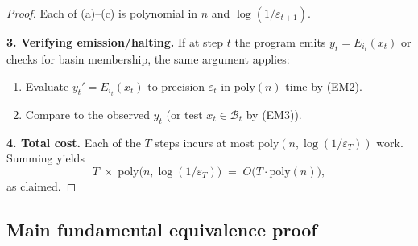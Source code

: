 \documentclass[12pt]{article}
\theoremstyle{definition}
\theoremstyle{plain}
\begin{document}
\begin{proof}
Each of (a)--(c) is polynomial in \(n\) and \(\log(1/\varepsilon_{t+1})\).

\medskip
\noindent\textbf{3. Verifying emission/halting.}
If at step \(t\) the program emits \(y_t = E_{i_t}(x_t)\) or checks for basin membership, the same argument applies:

\begin{enumerate}[label=(\alph*), leftmargin=2em]
  \item Evaluate \(y_t' = E_{i_t}(x_t)\) to precision \(\varepsilon_t\) in \(\mathrm{poly}(n)\) time by (EM2).
  \item Compare to the observed \(y_t\) (or test \(x_t\in\mathcal B_t\) by (EM3)).
\end{enumerate}

\medskip
\noindent\textbf{4. Total cost.}
Each of the \(T\) steps incurs at most \(\mathrm{poly}(n,\log(1/\varepsilon_T))\) work.  Summing yields
\[
  T \;\times\;\mathrm{poly}\bigl(n,\log(1/\varepsilon_T)\bigr)
  \;=\;
  O\!\bigl(T\cdot\mathrm{poly}(n)\bigr),
\]
as claimed.  
\end{proof}


\subsection{Main fundamental equivalence proof}
\end{document}
